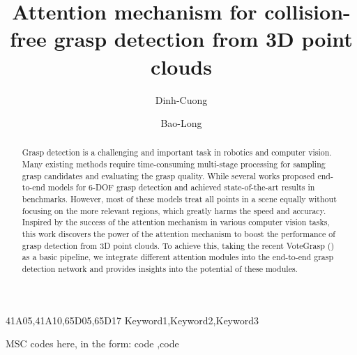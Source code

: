 \documentclass[times,referee,twocolumn,final,authoryear]{elsarticle}
\begin{document}
\setcounter{page}{1}

\begin{frontmatter}

\title{Attention mechanism for collision-free grasp detection from 3D point clouds}

\author[1]{Dinh-Cuong } 
\author[1]{Bao-Long }

\address[1]{ICT Department, FPT University, Hanoi, Vietnam}


\begin{abstract}

Grasp detection is a challenging and important task in robotics and computer vision. Many existing methods require time-consuming multi-stage processing for sampling grasp candidates and evaluating the grasp quality. While several works proposed end-to-end models for 6-DOF grasp detection and achieved state-of-the-art results in benchmarks. However, most of these models treat all points in a scene equally without focusing on the more relevant regions, which greatly harms the speed and accuracy. Inspired by the success of the attention mechanism in various computer vision tasks, this work discovers the power of the attention mechanism to boost the performance of grasp detection from 3D point clouds. To achieve this, taking the recent  VoteGrasp (\textcolor{cyan}{\cite{hoang2022context}}) as a basic pipeline, we integrate different attention modules into the end-to-end grasp detection network and provides insights into the potential of these modules.

\end{abstract}

\begin{keyword}
\MSC 41A05\sep 41A10\sep 65D05\sep 65D17
\KWD Keyword1\sep Keyword2\sep Keyword3

 MSC codes here, in the form: \MSC code \sep code
\end{keyword}

\end{frontmatter}




 
%

%

%






\end{document}
